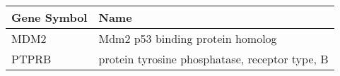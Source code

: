 \begin{tabular}{ll}
\toprule
Gene Symbol &                                           Name \\
\midrule
       MDM2 &               Mdm2 p53 binding protein homolog \\
      PTPRB & protein tyrosine phosphatase, receptor type, B \\
\bottomrule
\end{tabular}
